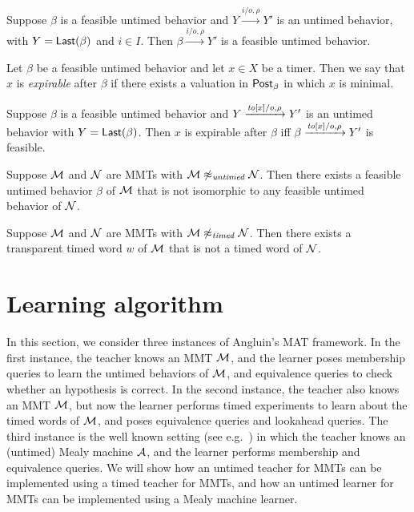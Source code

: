 \begin{lemma}
Suppose $\beta$ is a feasible untimed behavior and $Y \xrightarrow{i/o, \rho} Y'$ is an untimed behavior,
with $Y = \mathsf{Last}({\beta})$ and $i \in I$.
Then $\beta \xrightarrow{i/o, \rho} Y'$ is a feasible untimed behavior.
\end{lemma}

Let $\beta$ be a feasible untimed behavior and let $x \in X$ be a timer. Then we say that $x$ is \emph{expirable} after $\beta$
if there exists a valuation in $\mathsf{Post}_{\beta}$ in which $x$ is minimal.

\begin{lemma}
Suppose $\beta$ is a feasible untimed behavior and $Y \xrightarrow{\mathit{to}[x]/o, \rho} Y'$ is an untimed behavior 
with $Y = \mathsf{Last}({\beta})$.
Then $x$ is expirable after $\beta$ iff $\beta \xrightarrow{\mathit{to}[x]/o, \rho} Y'$ is feasible.
\end{lemma}

\begin{lemma}
\label{not untimed}
Suppose ${\cal M}$ and ${\cal N}$ are MMTs with ${\cal M} \not\approx_{\mathit{untimed}} {\cal N}$.
Then there exists a feasible untimed behavior $\beta$ of ${\cal M}$ that is not isomorphic to any feasible untimed
behavior of ${\cal N}$.
\end{lemma}

\begin{lemma}
\label{not timed}
Suppose ${\cal M}$ and ${\cal N}$ are MMTs with ${\cal M} \not\approx_{\mathit{timed}} {\cal N}$.
Then there exists a transparent timed word $w$ of ${\cal M}$ that is not a timed word of ${\cal N}$.
\end{lemma}

\fi

\section{Learning algorithm}  
\label{algorithm}
In this section, we consider three instances of Angluin's MAT framework.
In the first instance, the teacher knows an MMT ${\cal M}$, and the learner poses membership queries
to learn the untimed behaviors of ${\cal M}$, and equivalence queries to check whether an hypothesis is correct.
In the second instance, the teacher also knows an MMT ${\cal M}$, but now the 
learner performs timed experiments to learn about the
timed words of ${\cal M}$, and poses equivalence queries and lookahead queries.
The third instance is the well known setting (see e.g.\ \cite{Nie03,RSBM09}) 
in which the teacher knows an (untimed) Mealy machine ${\cal A}$,
and the learner performs membership and equivalence queries.
%
We will show how an untimed teacher for MMTs can be implemented using a timed teacher for MMTs,
and how an untimed learner for MMTs can be implemented using a Mealy machine learner.

